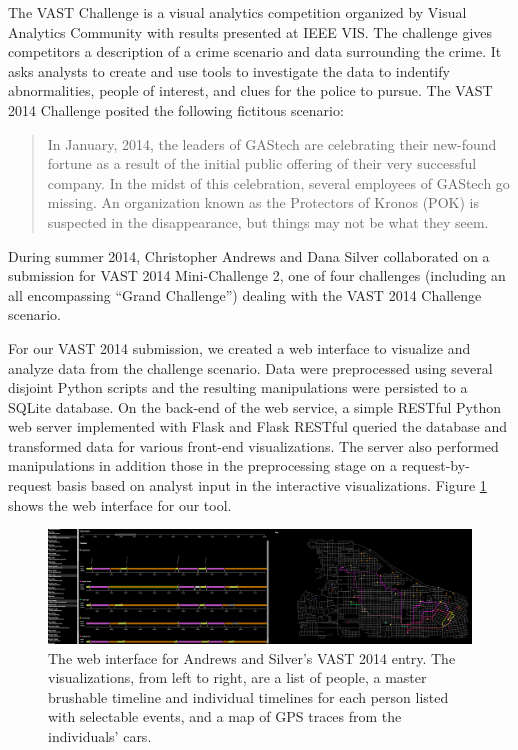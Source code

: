 \documentclass[midd]{thesis}
\begin{document}
The VAST Challenge is a visual analytics competition organized by Visual
Analytics Community with results presented at IEEE VIS. The challenge gives
competitors a description of a crime scenario and data surrounding the crime. It
asks analysts to create and use tools to investigate the data to indentify
abnormalities, people of interest, and clues for the police to pursue. The VAST
2014 Challenge \cite{vast2014} posited the following fictitous scenario:

\begin{quote}
In January, 2014, the leaders of GAStech are celebrating their new-found fortune
as a result of the initial public offering of their very successful company. In
the midst of this celebration, several employees of GAStech go missing. An
organization known as the Protectors of Kronos (POK) is suspected in the
disappearance, but things may not be what they seem.
\end{quote}

During summer 2014, Christopher Andrews and Dana Silver collaborated on a
submission for VAST 2014 Mini-Challenge 2, one of four challenges (including an
all encompassing ``Grand Challenge'') dealing with the VAST 2014 Challenge
scenario.

For our VAST 2014 submission, we created a web interface to visualize and
analyze data from the challenge scenario. Data were preprocessed using several
disjoint Python scripts and the resulting manipulations were persisted to a
SQLite database. On the back-end of the web service, a simple RESTful Python web
server implemented with Flask \cite{flask} and Flask RESTful
\cite{flask-restful} queried the database and transformed data for various
front-end visualizations. The server also performed manipulations in addition
those in the preprocessing stage on a request-by-request basis based on analyst
input in the interactive visualizations. Figure \ref{fig:vast2014} shows the web
interface for our tool.

\begin{figure}[!ht]
  \centering
  \includegraphics[width=1\textwidth]{vast-mc2-2014-cropped-scaled}
  \caption{The web interface for Andrews and Silver's VAST 2014 entry. The
  visualizations, from left to right, are a list of people, a master brushable
  timeline and individual timelines for each person listed with selectable
  events, and a map of GPS traces from the individuals' cars.}
  \label{fig:vast2014}
\end{figure}
\end{document}
